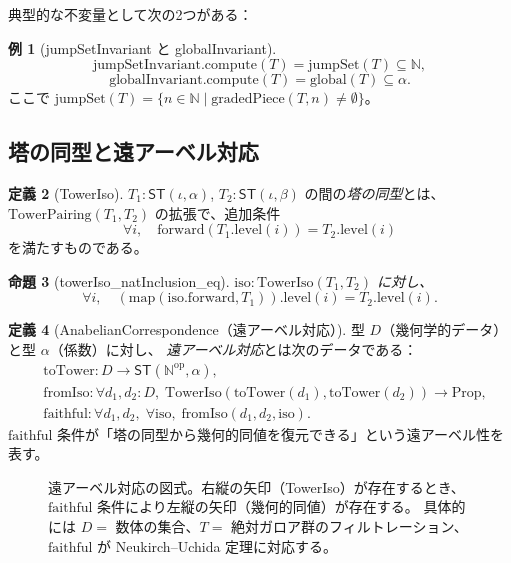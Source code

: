 \documentclass[a4paper,11pt]{ltjsarticle}
\theoremstyle{definition}
\newtheorem{definition}{定義}[section]
\newtheorem{example}[definition]{例}
\theoremstyle{plain}
\newtheorem{proposition}[definition]{命題}
\theoremstyle{remark}
\newcommand{\ST}{\mathsf{ST}}
\newcommand{\Nat}{\mathbb{N}}
\newcommand{\Nod}{\mathbb{N}^{\mathrm{op}}}
\begin{document}
典型的な不変量として次の2つがある：

\begin{example}[jumpSetInvariant と globalInvariant]
\[
  \mathrm{jumpSetInvariant}.\mathrm{compute}(T) = \mathrm{jumpSet}(T) \subseteq \Nat,
\]
\[
  \mathrm{globalInvariant}.\mathrm{compute}(T) = \mathrm{global}(T) \subseteq \alpha.
\]
ここで $\mathrm{jumpSet}(T) = \{n \in \Nat \mid \mathrm{gradedPiece}(T, n) \neq \emptyset\}$。
\end{example}

\subsection{塔の同型と遠アーベル対応}

\begin{definition}[TowerIso]
$T_1 : \ST(\iota, \alpha)$, $T_2 : \ST(\iota, \beta)$ の間の\emph{塔の同型}とは、
$\mathrm{TowerPairing}(T_1, T_2)$ の拡張で、追加条件
\[
  \forall i,\quad \mathrm{forward}(T_1.\mathrm{level}(i)) = T_2.\mathrm{level}(i)
\]
を満たすものである。
\end{definition}

\begin{proposition}[towerIso\_natInclusion\_eq]
$\mathrm{iso} : \mathrm{TowerIso}(T_1, T_2)$ に対し、
\[
  \forall i,\quad (\mathrm{map}(\mathrm{iso}.\mathrm{forward}, T_1)).\mathrm{level}(i)
  = T_2.\mathrm{level}(i).
\]
\end{proposition}

\begin{definition}[AnabelianCorrespondence（遠アーベル対応）]
\label{def:anabelian}
型 $D$（幾何学的データ）と型 $\alpha$（係数）に対し、
\emph{遠アーベル対応}とは次のデータである：
\begin{align*}
  &\mathrm{toTower} : D \to \ST(\Nod, \alpha), \\
  &\mathrm{fromIso} : \forall d_1, d_2 : D,\; \mathrm{TowerIso}(\mathrm{toTower}(d_1), \mathrm{toTower}(d_2)) \to \mathrm{Prop}, \\
  &\mathrm{faithful} : \forall d_1, d_2,\; \forall \mathrm{iso},\; \mathrm{fromIso}(d_1, d_2, \mathrm{iso}).
\end{align*}
$\mathrm{faithful}$ 条件が「塔の同型から幾何的同値を復元できる」という遠アーベル性を表す。
\end{definition}

\begin{figure}[H]
\centering
{}
\caption{遠アーベル対応の図式。右縦の矢印（TowerIso）が存在するとき、
$\mathrm{faithful}$ 条件により左縦の矢印（幾何的同値）が存在する。
具体的には $D = $ 数体の集合、$T = $ 絶対ガロア群のフィルトレーション、
$\mathrm{faithful}$ が Neukirch--Uchida 定理に対応する。}
\label{fig:anabelian}
\end{figure}
\end{document}
